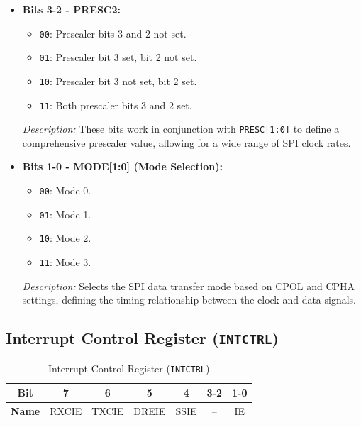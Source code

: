 \documentclass{article}
\begin{document}
\begin{itemize}
    \item \textbf{Bits 3-2 - PRESC2:} 
    \begin{itemize}
        \item \texttt{00}: Prescaler bits 3 and 2 not set.
        \item \texttt{01}: Prescaler bit 3 set, bit 2 not set.
        \item \texttt{10}: Prescaler bit 3 not set, bit 2 set.
        \item \texttt{11}: Both prescaler bits 3 and 2 set.
    \end{itemize}
    \textit{Description:} These bits work in conjunction with \texttt{PRESC[1:0]} to define a comprehensive prescaler value, allowing for a wide range of SPI clock rates.
    
    \item \textbf{Bits 1-0 - MODE[1:0] (Mode Selection):} 
    \begin{itemize}
        \item \texttt{00}: Mode 0.
        \item \texttt{01}: Mode 1.
        \item \texttt{10}: Mode 2.
        \item \texttt{11}: Mode 3.
    \end{itemize}
    \textit{Description:} Selects the SPI data transfer mode based on CPOL and CPHA settings, defining the timing relationship between the clock and data signals.
\end{itemize}

\subsection{Interrupt Control Register (\texttt{INTCTRL})}
\label{sec:intctrl}

\begin{table}[H]
    \centering
    \caption{Interrupt Control Register (\texttt{INTCTRL})}
    \begin{tabular}{@{}ccccccc@{}}
        \toprule
        \textbf{Bit} & 7 & 6 & 5 & 4 & 3-2 & 1-0 \\ \midrule
        \textbf{Name} & RXCIE & TXCIE & DREIE & SSIE & -- & IE \\ \bottomrule
    \end{tabular}
    \label{tab:intctrl}
\end{table}
\end{document}
